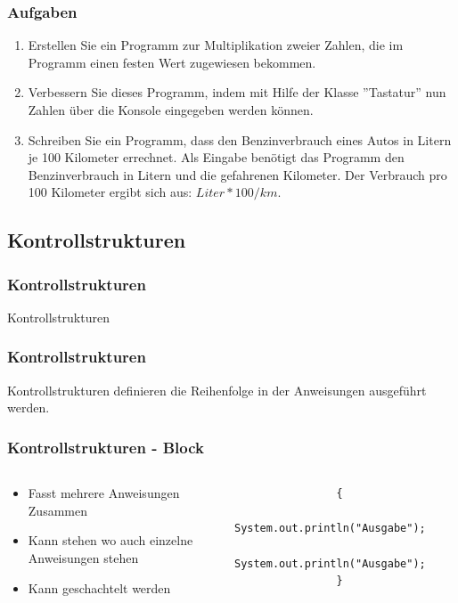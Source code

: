 \begin{frame}
	\frametitle{Aufgaben}
	\begin{enumerate}
	  \item Erstellen Sie ein Programm zur Multiplikation zweier Zahlen, die im
	  Programm einen festen Wert zugewiesen bekommen.
	  \item Verbessern Sie dieses Programm, indem mit Hilfe der Klasse ''Tastatur''
	  nun Zahlen über die Konsole eingegeben werden können.
	  \item Schreiben Sie ein Programm, dass den Benzinverbrauch eines Autos in
			Litern je 100 Kilometer errechnet. Als Eingabe benötigt das Programm den
			Benzinverbrauch in Litern und die gefahrenen Kilometer. Der Verbrauch pro 100
			Kilometer ergibt sich aus: $Liter * 100/km$.
	\end{enumerate} 
\end{frame}

\subsection{Kontrollstrukturen}
\begin{frame}[fragile]
	\frametitle{Kontrollstrukturen}
	\huge Kontrollstrukturen
\end{frame}

\begin{frame}[fragile]
	\frametitle{Kontrollstrukturen}
	  Kontrollstrukturen definieren die Reihenfolge in der Anweisungen ausgeführt
	  werden.
\end{frame}

\begin{frame}[fragile]
	\frametitle{Kontrollstrukturen - Block}
	\begin{columns}
		\begin{column}{0.5\textwidth}
			\small
			\begin{itemize}
			\item Fasst mehrere Anweisungen Zusammen
			\item Kann stehen wo auch einzelne Anweisungen stehen
			\item Kann geschachtelt werden
		\end{itemize}
		\end{column}
		\begin{column}{0.5\textwidth}
			\begin{lstlisting}
				{
					System.out.println("Ausgabe");
					System.out.println("Ausgabe");
				}
			\end{lstlisting}
		\end{column}
	\end{columns}
\end{frame}

